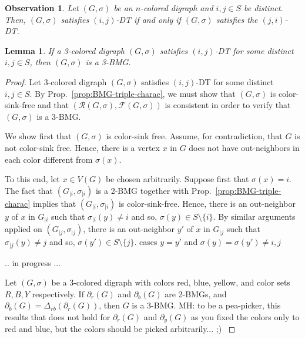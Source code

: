 \documentclass[final,3p,times]{elsarticle}
\newtheorem{lemma}[theorem]{Lemma}%
\newtheorem{fact}{Observation}[section]
\newcommand{\TODO}[1]{\begingroup\color{red}#1\endgroup}
\newcommand{\mh}[1]{\begingroup\color{blue}#1\endgroup}
\begin{document}
\begin{fact}
\mh{Let $(G,\sigma)$ be an $n$-colored digraph and $i,j\in S$ be distinct. 
Then, $(G,\sigma)$ satisfies $(i,j)$-DT  if and only if 
$(G,\sigma)$ satisfies the $(j,i)$-DT.}
\end{fact}




\begin{lemma}\label{lem:sufficient_condition}
\mh{If a 3-colored digraph $(G,\sigma)$ satisfies $(i,j)$-DT for some 
distinct $i,j\in S$, then $(G,\sigma)$ is a 3-BMG.}
\end{lemma}
\begin{proof}
\mh{
Let 3-colored digraph $(G,\sigma)$ satisfies $(i,j)$-DT for some distinct
$i,j\in S$. By Prop.\ \ref{prop:BMG-triple-charac}, we must show that
$(G,\sigma)$ is color-sink-free and that
$(\mathscr{R}(G,\sigma),\mathscr{F}(G,\sigma))$ is consistent in order to verify
that $(G,\sigma)$ is a 3-BMG.
  
We show first that $(G,\sigma)$ is color-sink free.  Assume, for contradiction, that 
$G$ is not  color-sink free. Hence, there is a vertex $x$ in $G$ does not have 
out-neighbors in each color different from $\sigma(x)$.




To this end, let $x\in V(G)$
be chosen arbitrarily.
Suppose first that $\sigma(x)=i$. The fact that
$(G_{|i},\sigma_{|i})$ is a 2-BMG together with Prop.\
\ref{prop:BMG-triple-charac} implies that $(G_{|i},\sigma_{|i})$ is
color-sink-free. Hence, there is an out-neighbor $y$ of $x$ in $G_{|i}$ such
that $\sigma_{|i}(y)\neq i$ and so, $\sigma(y)\in S\setminus \{i\}$.
By similar arguments applied on $(G_{|j},\sigma_{|j})$, 
there is an out-neighbor $y'$ of $x$ in $G_{|j}$ such
that $\sigma_{|j}(y)\neq j$ and so, $\sigma(y')\in S\setminus \{j\}$.
\TODO{cases $y=y'$ and $\sigma(y)=\sigma(y')\neq i,j$}


}




\TODO{.. in progress ... }

Let $(G,\sigma)$ be a 3-colored digraph with colors red, blue, yellow, and color sets $R,B,Y$ respectively. If $\partial_r(G)$ and $\partial_b(G)$ are 2-BMGs, and $\partial_b(G)=\Delta_{rb}(\partial_r(G))$, then $G$ is a 3-BMG. \TODO{MH: to be a pea-picker, this results that does not hold
for  $\partial_r(G)$ and $\partial_y(G)$ as you fixed the colors only to red and blue, but the colors should be picked arbitrarily... ;)  }



\end{proof}
\end{document}
